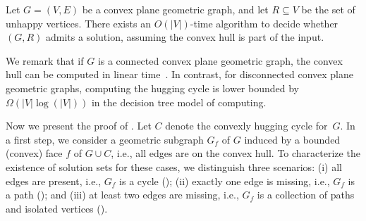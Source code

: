 \documentclass[a4paper,runningheads,cleveref,thm-restate]{lipics-v2021}
\newcommand{\hset}{solution set\xspace}
\newcommand{\hug}{hugging cycle\xspace}
\begin{document}
\begin{corollary}
	\label{cor:convexPos}
	Let $G=(V,E)$ be a convex plane geometric graph, and let $R\subseteq V$ be the set of unhappy vertices. There exists an $O(|V|)$-time algorithm to decide whether $(G,R)$ admits a solution, 
	assuming the convex hull is part of the input.
\end{corollary}

We remark that
if $G$ is a connected convex plane geometric graph, the convex hull can be computed in linear time~\cite{Melkman87}. 
In contrast, for disconnected convex plane geometric graphs, computing  
the \hug is lower bounded by $\Omega(|V|\log (|V|))$ 
in the decision tree model of computing. 

Now we present the proof of .
Let $C$ denote the convexly \hug for~$G$. 
In a first step, we consider a geometric subgraph $G_f$ of $G$ induced by a bounded (convex) face $f$ of $G\cup C$, i.e., all edges are on the convex hull. To characterize  the existence of \hset{s} for these cases,
we distinguish three scenarios: 
(i) all edges are present, i.e., $G_f$ is a cycle (); 
(ii) exactly one edge is missing, i.e., $G_f$ is a path (); and
(iii) at least two edges are missing, i.e., $G_f$ is a collection of paths and isolated vertices ().
\end{document}
